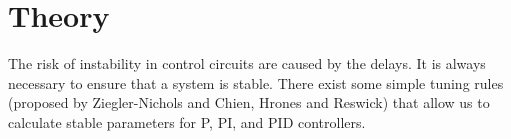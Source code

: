 \section{Theory}

The  risk  of  instability in control circuits are caused by the delays. It is
always  necessary to ensure that a system is stable. There exist  some  simple
tuning rules (proposed by Ziegler-Nichols and Chien, Hrones and Reswick)  that
allow us to calculate stable  parameters  for  P,  PI,  and  PID  controllers.





